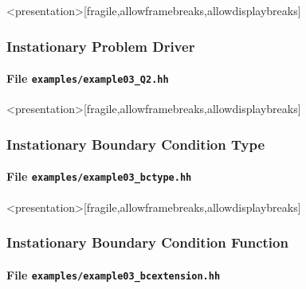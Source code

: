 \begin{frame}<presentation>[fragile,allowframebreaks,allowdisplaybreaks]
\frametitle<presentation>{Instationary Problem Driver}
\framesubtitle<presentation>{File \texttt{examples/example03\_Q2.hh}}

\end{frame}

\begin{frame}<presentation>[fragile,allowframebreaks,allowdisplaybreaks]
\frametitle<presentation>{Instationary Boundary Condition Type}
\framesubtitle<presentation>{File \texttt{examples/example03\_bctype.hh}}

\end{frame}

\begin{frame}<presentation>[fragile,allowframebreaks,allowdisplaybreaks]
\frametitle<presentation>{Instationary Boundary Condition Function}
\framesubtitle<presentation>{File \texttt{examples/example03\_bcextension.hh}}

\end{frame}


